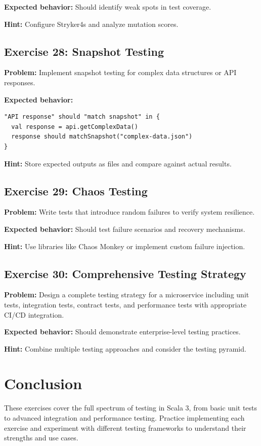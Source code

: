 \documentclass[12pt,a4paper]{article}
\begin{document}
\textbf{Expected behavior:} Should identify weak spots in test coverage.

\textbf{Hint:} Configure Stryker4s and analyze mutation scores.

\subsection{Exercise 28: Snapshot Testing}
\textbf{Problem:} Implement snapshot testing for complex data structures or API responses.

\textbf{Expected behavior:}
\begin{lstlisting}
"API response" should "match snapshot" in {
  val response = api.getComplexData()
  response should matchSnapshot("complex-data.json")
}
\end{lstlisting}

\textbf{Hint:} Store expected outputs as files and compare against actual results.

\subsection{Exercise 29: Chaos Testing}
\textbf{Problem:} Write tests that introduce random failures to verify system resilience.

\textbf{Expected behavior:} Should test failure scenarios and recovery mechanisms.

\textbf{Hint:} Use libraries like Chaos Monkey or implement custom failure injection.

\subsection{Exercise 30: Comprehensive Testing Strategy}
\textbf{Problem:} Design a complete testing strategy for a microservice including unit tests, integration tests, contract tests, and performance tests with appropriate CI/CD integration.

\textbf{Expected behavior:} Should demonstrate enterprise-level testing practices.

\textbf{Hint:} Combine multiple testing approaches and consider the testing pyramid.

\section{Conclusion}

These exercises cover the full spectrum of testing in Scala 3, from basic unit tests to advanced integration and performance testing. Practice implementing each exercise and experiment with different testing frameworks to understand their strengths and use cases.
\end{document}
